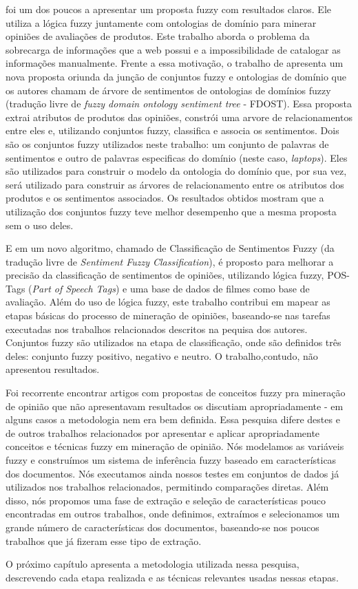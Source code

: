 \documentclass[template.tex]{subfiles}
\begin{document}
 foi um dos poucos a apresentar um proposta fuzzy com resultados claros. Ele utiliza a lógica fuzzy  juntamente com ontologias de domínio para minerar opiniões de avaliações de produtos. Este trabalho aborda o problema da sobrecarga de informações que a web possui e a impossibilidade de catalogar as informações manualmente. Frente a essa motivação, o trabalho de  apresenta um nova proposta oriunda da junção de conjuntos fuzzy e ontologias de domínio que os autores chamam de árvore de sentimentos de ontologias de domínios fuzzy (tradução livre de \textit{fuzzy domain ontology sentiment tree} - FDOST). Essa proposta extrai atributos de produtos das opiniões, constrói uma arvore de relacionamentos entre eles e, utilizando conjuntos fuzzy, classifica e associa os sentimentos. Dois são os conjuntos fuzzy utilizados neste trabalho: um conjunto de palavras de sentimentos e outro de palavras especificas do domínio (neste caso, \textit{laptops}). Eles são utilizados para construir o modelo da ontologia do domínio que, por sua vez, será utilizado para construir as árvores de relacionamento entre os atributos dos produtos e os sentimentos associados. Os resultados obtidos mostram que a utilização dos conjuntos fuzzy teve melhor desempenho que a mesma proposta sem o uso deles. 

E em  um novo algoritmo, chamado de Classificação de Sentimentos Fuzzy (da tradução livre de \textit{Sentiment Fuzzy Classification}), é proposto para melhorar a precisão da classificação de sentimentos de opiniões, utilizando lógica fuzzy, POS-Tags (\textit{Part of Speech Tags}) e uma base de dados de filmes como base de avaliação. Além do uso de lógica fuzzy, este trabalho contribui em mapear as etapas básicas do processo de mineração de opiniões, baseando-se nas tarefas executadas nos trabalhos relacionados descritos na pequisa dos autores. Conjuntos fuzzy são utilizados na etapa de classificação, onde são definidos três deles: conjunto fuzzy positivo, negativo e neutro. O trabalho,contudo, não apresentou resultados. 

Foi recorrente encontrar artigos com propostas de conceitos fuzzy pra mineração de opinião que não apresentavam resultados os discutiam apropriadamente - em alguns casos a metodologia nem era bem definida. Essa pesquisa difere destes e de outros trabalhos relacionados por apresentar e aplicar apropriadamente conceitos e técnicas fuzzy em mineração de opinião. Nós modelamos as variáveis fuzzy e construímos um sistema de inferência fuzzy baseado em características dos documentos. Nós executamos ainda nossos testes em conjuntos de dados já utilizados nos trabalhos relacionados, permitindo comparações diretas. Além disso, nós propomos uma fase de extração e seleção de características pouco encontradas em outros trabalhos, onde definimos, extraímos e selecionamos um grande número de características dos documentos, baseando-se nos poucos trabalhos que já fizeram esse tipo de extração.

O próximo capítulo apresenta a metodologia utilizada nessa pesquisa, descrevendo cada etapa realizada e as técnicas relevantes usadas nessas etapas.

\end{document}
